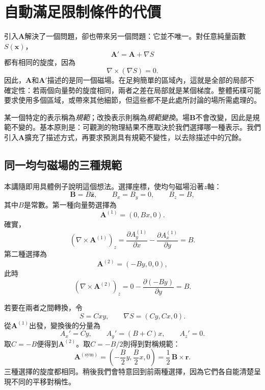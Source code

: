 \section{自動滿足限制條件的代價}

引入\(\mathbf A\)解決了一個問題，卻也帶來另一個問題：它並不唯一。對任意純量函數\(S(\mathbf x)\)，
\begin{equation}
  \mathbf A'=\mathbf A+\nabla S
\end{equation}
都有相同的旋度，因為
\begin{equation}
  \nabla\times(\nabla S)=0.
\end{equation}
因此，\(\mathbf A\)和\(\mathbf A'\)描述的是同一個磁場。在足夠簡單的區域內，這就是全部的局部不確定性：若兩個向量勢的旋度相同，兩者之差在局部就是某個梯度。整體拓樸可能要求使用多個區域，或帶來其他細節，但這些都不是此處所討論的場所需處理的。

某一個特定的表示稱為\emph{規範}；改換表示則稱為\emph{規範變換}。場\(\mathbf B\)不會改變，因此是規範不變的。基本原則是：可觀測的物理結果不應取決於我們選擇哪一種表示。我們引入\(\mathbf A\)擴充了描述方式，再要求預測具有規範不變性，以去除描述中的冗餘。

\subsection{同一均勻磁場的三種規範}

本講隨即用具體例子說明這個想法。選擇座標，使均勻磁場沿著\(z\)軸：
\begin{equation}
  \mathbf B=B\hat{\mathbf z},
  \qquad
  B_x=B_y=0,
  \qquad
  B_z=B,
\end{equation}
其中\(B\)是常數。第一種向量勢選擇為
\begin{equation}
  \mathbf A^{(1)}=(0,Bx,0).
\end{equation}
確實，
\begin{equation}
  (\nabla\times\mathbf A^{(1)})_z
  =
  \frac{\partial A_y^{(1)}}{\partial x}
  -
  \frac{\partial A_x^{(1)}}{\partial y}
  =B.
\end{equation}
第二種選擇為
\begin{equation}
  \mathbf A^{(2)}=(-By,0,0),
\end{equation}
此時
\begin{equation}
  (\nabla\times\mathbf A^{(2)})_z
  =
  0-\frac{\partial(-By)}{\partial y}
  =B.
\end{equation}

若要在兩者之間轉換，令
\begin{equation}
  S=Cxy,
  \qquad
  \nabla S=(Cy,Cx,0).
\end{equation}
從\(\mathbf A^{(1)}\)出發，變換後的分量為
\begin{equation}
  A_x'=Cy,
  \qquad
  A_y'=(B+C)x,
  \qquad
  A_z'=0.
\end{equation}
取\(C=-B\)便得到\(\mathbf A^{(2)}\)。取\(C=-B/2\)則得到對稱規範：
\begin{equation}
  \mathbf A^{(\mathrm{sym})}
  =
  \left(-\frac{B}{2}y,\frac{B}{2}x,0\right)
  =
  \frac12\,\mathbf B\times\mathbf r.
\end{equation}
三種選擇的旋度都相同。稍後我們會特意回到前兩種選擇，因為它們各自能清楚呈現不同的平移對稱性。

